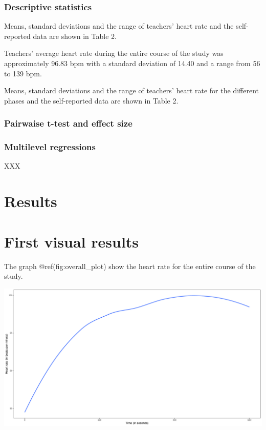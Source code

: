 \documentclass[
  man,floatsintext]{apa6}
\begin{document}
\hypertarget{descriptive-statistics}{%
\subsubsection{Descriptive statistics}\label{descriptive-statistics}}

Means, standard deviations and the range of teachers' heart rate and the self-reported data are shown in Table 2.

Teachers' average heart rate during the entire course of the study was approximately 96.83 bpm with a standard deviation of 14.40 and a range from 56 to 139 bpm.

Means, standard deviations and the range of teachers' heart rate for the different phases and the self-reported data are shown in Table 2.

\hypertarget{pairwaise-t-test-and-effect-size}{%
\subsubsection{Pairwaise t-test and effect size}\label{pairwaise-t-test-and-effect-size}}

\hypertarget{multilevel-regressions}{%
\subsubsection{Multilevel regressions}\label{multilevel-regressions}}

XXX

\hypertarget{results}{%
\section{Results}\label{results}}

\hypertarget{first-visual-results}{%
\section{First visual results}\label{first-visual-results}}

The graph @ref(fig:overall\_plot) show the heart rate for the entire course of the study.

\includegraphics{fitbit_paper_files/figure-latex/overall_plot-1.pdf}
\end{document}
